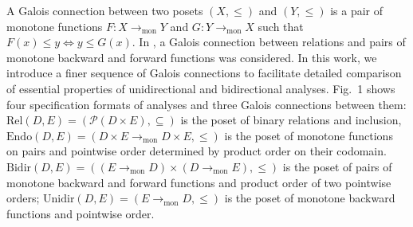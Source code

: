 \documentclass{easychair}
\theoremstyle{definition}
\newcommand{\Pow}{\mathcal{P}}
\newcommand{\Rel}{\mathrm{Rel}}
\newcommand{\Endo}{\mathrm{Endo}}
\newcommand{\Bidir}{\mathrm{Bidir}}
\newcommand{\Unidir}{\mathrm{Unidir}}
\newcommand{\tomon}{\to_{\mathrm{mon}}}
\newcommand{\ff}{{f^{\rightarrow}}}
\newcommand{\fb}{{f^{\leftarrow}}}
\newcommand{\gf}{{g^{\rightarrow}}}
\newcommand{\gb}{{g^{\leftarrow}}}
\begin{document}



A Galois connection between two posets $(X , \leq)$ and $(Y , \leq)$ is a pair
of monotone functions $F : X \tomon Y$ and $G : Y \tomon X$ such that $F(x) \leq y \iff y \leq G(x)$.
In \cite{frade_bidirectional_2009}, a Galois connection between relations and pairs of monotone backward and forward functions was considered.
In this work, we introduce a finer sequence of
Galois connections to facilitate detailed comparison of essential properties
of unidirectional and bidirectional analyses. Fig.~1 shows four specification formats of analyses 
and three Galois connections between them: $\Rel(D, E)= (\Pow(D \times E), \subseteq)$
is the poset of binary relations and inclusion, $\Endo(D , E) = (D \times E \tomon D \times E, {\leq})$
is the poset of monotone functions on pairs and pointwise order determined
by product order on their codomain. $\Bidir(D , E) = ((E \tomon D) \times (D \tomon E), \leq)$ is the poset of pairs of monotone backward and forward functions and product
order of two pointwise orders; $\Unidir(D , E) = (E \tomon D, \leq)$ is the poset of monotone backward functions and pointwise order.
\end{document}
